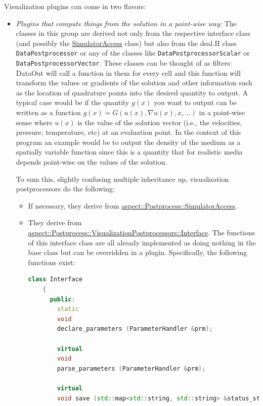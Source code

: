 \documentclass{article}
\begin{document}
Visualization plugins can come in two flavors:
\begin{itemize}
  \item \textit{Plugins that compute things from the solution in a point-wise way:}
   The classes in this group are derived not only from the respective interface class (and possibly
   the \href{doc/doxygen/classaspect_1_1SimulatorAccess.html}{SimulatorAccess} class) but also from the deal.II class
   \texttt{DataPostprocessor} or any of
   the classes like \texttt{DataPostprocessorScalar} or \texttt{DataPostprocessorVector}.
   These classes can be thought of as filters: DataOut will call a function in
   them for every cell and this function will transform the values or gradients
   of the solution and other information such as the location of quadrature
   points into the desired quantity to output. A typical case would be
   if the quantity $g(x)$ you want to output can be written as a function
   $g(x) = G(u(x),\nabla u(x), x, ...)$ in a point-wise sense where $u(x)$
   is the value of the solution vector (i.e., the velocities, pressure,
   temperature, etc) at an evaluation point. In the context
   of this program an example would be to output the density of the medium as
   a spatially variable function since this is a quantity that for realistic
   media depends point-wise on the values of the solution.

To sum this, slightly confusing multiple inheritance up, visualization
postprocessors do the following:
\begin{itemize}
\item If necessary, they derive from
  \href{doc/doxygen/classaspect_1_1Postprocess_1_1SimulatorAccess.html}{aspect::Postprocess::SimulatorAccess}.
\item They derive from
  \href{doc/doxygen/classaspect_1_1Postprocess_1_1VisualizationPostprocessors_1_1Interface.html}{aspect::Postprocess::VisualizationPostprocessors::Interface}. The
  functions of this interface class are all already implemented as doing
  nothing in the base class but can be overridden in a plugin. Specifically,
  the following functions exist:
  \begin{lstlisting}[frame=single,language=C++]
    class Interface
    {
      public:
        static
        void
        declare_parameters (ParameterHandler &prm);

        virtual
        void
        parse_parameters (ParameterHandler &prm);

        virtual
        void save (std::map<std::string, std::string> &status_strings) const;


\end{lstlisting}
\end{itemize}
\end{itemize}
\end{document}
